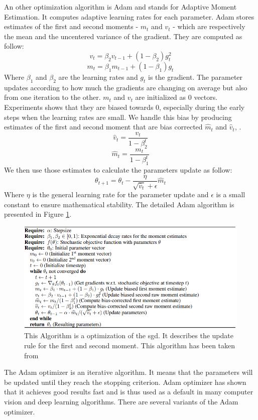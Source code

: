 An other optimization algorithm is Adam and stands for Adaptive Moment Estimation. It computes adaptive learning rates for each parameter. Adam stores estimates of the first and second moments - \(m_t\) and \(v_t\) - which are respectively the mean and the uncentered variance of the gradient. They are computed as follow: \[ v_t = \beta_2 v_{t-1} + (1 - \beta_2)g_t^2 \] \[m_t = \beta_1 m_{t-1} + (1 - \beta_1)g_t \]
Where \(\beta_1\) and \(\beta_2\) are the learning rates and \(g_t\) is the gradient. The parameter updates according to how much the gradients are changing on average but also from one iteration to the other.  \(m_t\) and \(v_t\) are initialized as 0 vectors. Experiments shows that they are biased towards 0, especially during the early steps when the learning rates are small. We handle this bias by producing estimates of the first and second moment that are bias corrected \(\hat{m}_t\) and \(\hat{v}_t\), \cite{adam}.
\[ \hat{v}_t=  \frac{v_{t}}{1 - \beta_2^t}\] 
\[\hat{m}_t=  \frac{m_{t}}{1 - \beta_1^t}\] 
We then use those estimates to calculate the parameters update as follow: \[\theta_{t+1} = \theta_t - \frac{\eta}{\sqrt{\hat{v}_t} + \epsilon}\hat{m}_t\]
Where \(\eta\) is the general learning rate for the parameter update and \(\epsilon\) is a small constant to ensure mathematical stability. 
The detailed  Adam algorithm is presented in Figure \ref{fig:adam_algo}.
\begin{figure}[!htp]
    \centering
        \includegraphics[width=1\textwidth]{figures/02-adam_algo}
        \caption[Adam Algorithm]{ This Algorithm is a optimization of the \gls{sgd}. It describes the update rule for the first and second moment. This algorithm has been taken from \cite{adam}}\label{fig:adam_algo}
\end{figure}
The Adam optimizer is an iterative algorithm. It means that the parameters will be updated until they reach the stopping criterion. 
Adam optimizer has shown that it achieves good results fast and is thus used as a default in many 
computer vision and deep learning algorithms. There are several variants of the Adam optimizer.

